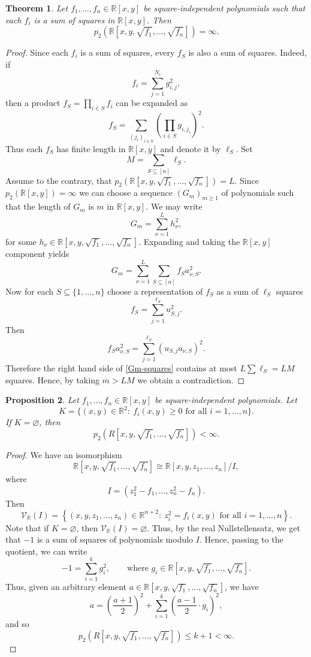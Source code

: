 \documentclass[12pt,reqno]{amsart}   	%
\newtheorem{thm}{Theorem}[section]
\newtheorem{prop}[thm]{Proposition}
\theoremstyle{remark}
\newcommand{\R}{\mathbb{R}}
\newcommand{\brac}[1]{\left ( #1 \right )}
\begin{document}
\begin{thm}
    Let $f_1,\dots, f_n\in\R[x,y]$ be square-independent polynomials such that each $f_i$ is a sum of squares in $\R[x,y]$. Then
    \[
    p_2\brac{\R[x,y,\sqrt{f_1},\dots,\sqrt{f_n}]} = \infty.
    \]
\end{thm}
\begin{proof}
    Since each $f_i$ is a sum of squares, every $f_S$ is also a sum of squares. Indeed, if
    \[
            f_i=\sum_{j=1}^{N_i} g_{i,j}^2,
    \]
    then a product $f_S=\prod_{i\in S}f_i$ can be expanded as
    \[
            f_S = \sum_{(j_i)_{i\in S}} \left(\prod_{i\in S}g_{i,j_i}\right)^2.
    \]
    Thus each $f_S$ has finite length in $\R[x,y]$ and denote it by $\ell_S$. Set
    \[
    M = \sum_{S\subseteq [n]} \ell_S.
    \]
    Assume to the contrary, that $p_2(\R[x,y,\sqrt{f_1},\dots,\sqrt{f_n}])=L$. Since $p_2(\R[x,y]) = \infty$ we can choose a sequence $(G_m)_{m\geq1}$ of polynomials such that the length of $G_m$ is $m$ in $\R[x,y]$. We may write
    \[
    G_m = \sum_{\nu=1}^L h_\nu^2,
    \]
    for some $h_\nu\in\R[x,y,\sqrt{f_1},\dots,\sqrt{f_n}]$. Expanding and taking the $\R[x,y]$ component yields
    \begin{equation}
        G_m = \sum_{\nu=1}^{L} \sum_{S\subseteq [n]} f_Sa_{\nu,S}^2.
        \label{Gm-squares}
    \end{equation}
    Now for each $S\subseteq\{1,\dots, n\}$ choose a representation of $f_S$ as a sum of $\ell_S$ squares
    \[
    f_S=\sum_{j=1}^{\ell_S} u_{S,j}^2.
    \]
    Then
    \[
    f_Sa_{\nu,S}^2 = \sum_{j=1}^{\ell_S} (u_{S,j}a_{\nu,S})^2.
    \]
    Therefore the right hand side of \eqref{Gm-squares} contains at most $L\sum\ell_S = LM$ squares. Hence, by taking $m>LM$ we obtain a contradiction.
\end{proof}

\begin{prop}
    Let $f_1,\dots, f_n\in\R[x,y]$ be square-independent polynomials. Let
    \[
    K=\{(x,y)\in\mathbb R^2 :\ f_i(x,y)\geq 0
    \text{ for all }i=1,\ldots,n\}.
    \]
    If $K=\varnothing$, then
    \[
    p_2\brac{R[x,y,\sqrt{f_1},\ldots,\sqrt{f_n}]} <\infty.
    \]
\end{prop}
\begin{proof}
    We have an isomorphism
    \[
    \R[x,y,\sqrt{f_1},\ldots,\sqrt{f_n}] \cong \R[x,y,z_1,\dots,z_n]/I,
    \]
    where
    \[
    I = \brac{z_1^2-f_1,\dots,z_n^2-f_n}.
    \]
    Then
    \[
    \mathcal V_\R(I) = \left\{ (x,y,z_1,\dots,z_n)\in\R^{n+2} : \ z_i^2=f_i(x,y)
    \text{ for all }i=1,\ldots,n \right\}.
    \]
    Note that if $K=\varnothing$, then $\mathcal{V}_\R(I)=\varnothing$. Thus, by the real Nullstellensatz, we get that $-1$ is a sum of squares of polynomials modulo $I$. Hence, passing to the quotient, we can write
    \[
    -1 = \sum_{i=1}^k g_i^2,\qquad\text{where }g_i\in \R[x,y,\sqrt{f_1},\ldots,\sqrt{f_n}].
    \]
    Thus, given an arbitrary element $a\in \R[x,y,\sqrt{f_1},\ldots,\sqrt{f_n}]$, we have
    \[
    a = \brac{\frac{a+1}{2}}^2 + \sum_{i=1}^k \brac{\frac{a-1}{2}\cdot g_i}^2,
    \]
    and so
    \[
    p_2\brac{R[x,y,\sqrt{f_1},\ldots,\sqrt{f_n}]} \leq k+1<\infty.
    \]
\end{proof}
\end{document}
